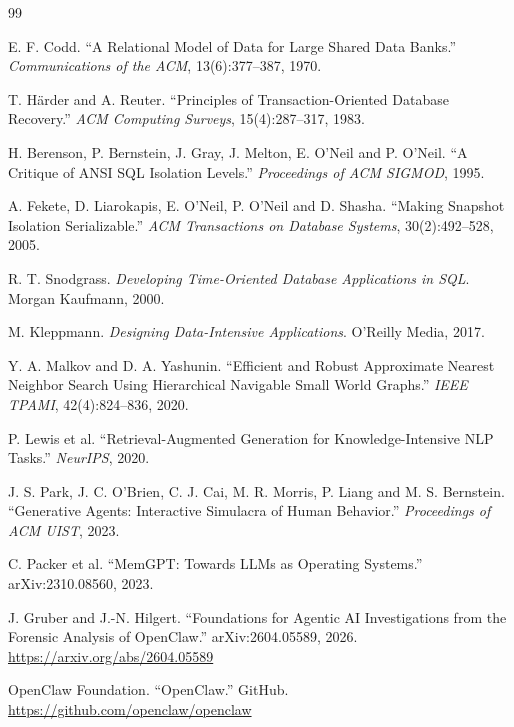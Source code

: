 \documentclass[11pt,a4paper]{article}
\begin{document}
\begin{thebibliography}{99}
{\small\setlength{\itemsep}{0.35\baselineskip}

 E. F. Codd. ``A Relational Model of Data for Large
Shared Data Banks.'' \emph{Communications of the ACM}, 13(6):377--387,
1970.

 T. Härder and A. Reuter. ``Principles of
Transaction-Oriented Database Recovery.'' \emph{ACM Computing Surveys},
15(4):287--317, 1983.

 H. Berenson, P. Bernstein, J. Gray, J. Melton,
E. O'Neil and P. O'Neil. ``A Critique of ANSI SQL Isolation Levels.''
\emph{Proceedings of ACM SIGMOD}, 1995.

 A. Fekete, D. Liarokapis, E. O'Neil, P. O'Neil and
D. Shasha. ``Making Snapshot Isolation Serializable.'' \emph{ACM
Transactions on Database Systems}, 30(2):492--528, 2005.

 R. T. Snodgrass. \emph{Developing Time-Oriented
Database Applications in SQL}. Morgan Kaufmann, 2000.

 M. Kleppmann. \emph{Designing Data-Intensive
Applications}. O'Reilly Media, 2017.

 Y. A. Malkov and D. A. Yashunin. ``Efficient and
Robust Approximate Nearest Neighbor Search Using Hierarchical Navigable
Small World Graphs.'' \emph{IEEE TPAMI}, 42(4):824--836, 2020.

 P. Lewis et al. ``Retrieval-Augmented Generation for
Knowledge-Intensive NLP Tasks.'' \emph{NeurIPS}, 2020.

 J. S. Park, J. C. O'Brien, C. J. Cai, M. R. Morris,
P. Liang and M. S. Bernstein. ``Generative Agents: Interactive Simulacra
of Human Behavior.'' \emph{Proceedings of ACM UIST}, 2023.

 C. Packer et al. ``MemGPT: Towards LLMs as
Operating Systems.'' arXiv:2310.08560, 2023.

 J. Gruber and J.-N. Hilgert. ``Foundations for
Agentic AI Investigations from the Forensic Analysis of OpenClaw.''
arXiv:2604.05589, 2026. \url{https://arxiv.org/abs/2604.05589}

 OpenClaw Foundation. ``OpenClaw.'' GitHub.
\url{https://github.com/openclaw/openclaw}

}
\end{thebibliography}
\end{document}
